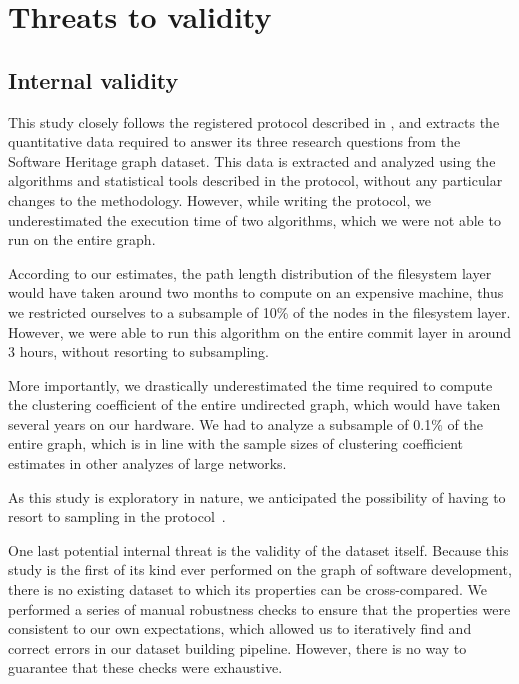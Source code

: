 \section{Threats to validity}%
\label{sec:topology-threats}

\subsection{Internal validity}

This study closely follows the registered protocol described
in \textcite{msr-2020-topology}, and extracts the quantitative data required to
answer its three research questions from the Software Heritage graph dataset.
This data is extracted and analyzed using the algorithms and statistical tools
described in the protocol, without any particular changes to the methodology.
However, while writing the protocol, we underestimated the execution time of
two algorithms, which we were not able to run on the entire graph.

According to our estimates, the path length distribution of the filesystem
layer would have taken around two months to compute on an expensive machine,
thus we restricted ourselves to a subsample of 10\% of the nodes in the
filesystem layer. However, we were able to run this algorithm on the entire
commit layer in around 3 hours, without resorting to subsampling.

More importantly, we drastically underestimated the time required to compute
the clustering coefficient of the entire undirected graph, which would have
taken several years on our hardware. We had to analyze a subsample of
0.1\% of the entire graph, which is in line with the sample sizes of
clustering coefficient estimates in other analyzes of large
networks.

As this study is exploratory in nature, we anticipated the possibility of
having to resort to sampling in the
protocol~\cite[Section 7]{msr-2020-topology}.

One last potential internal threat is the validity of the dataset itself.
Because this study is the first of its kind ever performed on the graph of
software development, there is no existing dataset to which its properties can
be cross-compared. We performed a series of manual robustness checks to ensure
that the properties were consistent to our own expectations, which allowed us
to iteratively find and correct errors in our dataset building pipeline.
However, there is no way to guarantee that these checks were exhaustive.

